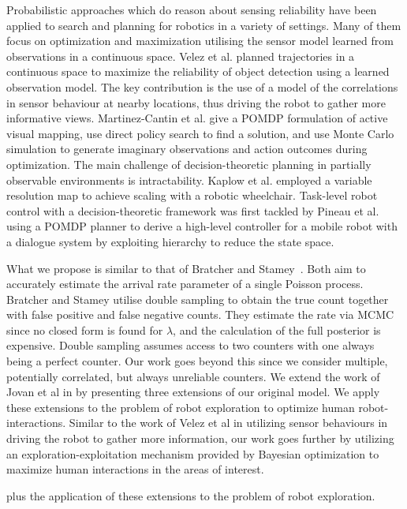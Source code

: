 Probabilistic approaches which do reason about sensing reliability have been applied to search and planning for robotics in a variety of settings. Many of them focus on optimization and maximization utilising the sensor model learned from observations in a continuous space. Velez et al. \cite{velez2012modelling} planned trajectories in a continuous space to maximize the reliability of object detection using a learned observation model. The key contribution is the use of a model of the correlations in sensor behaviour at nearby locations, thus driving the robot to gather more informative views. Martinez-Cantin et al. \cite{martinez2009bayesian} give a POMDP formulation of active visual mapping, use direct policy search to find a solution, and use Monte Carlo simulation to generate imaginary observations and action outcomes during optimization. The main challenge of decision-theoretic planning in partially observable environments is intractability. Kaplow et al. \cite{kaplow2010variable} employed a variable resolution map to achieve scaling with a robotic wheelchair. Task-level robot control with a decision-theoretic framework was first tackled by Pineau et al. \cite{pineau2003towards} using a POMDP planner to derive a high-level controller for a mobile robot with a dialogue system by exploiting hierarchy to reduce the state space.

What we propose is similar to that of Bratcher and Stamey~\cite{bratcher2002}. Both aim to accurately estimate the arrival rate parameter of a single Poisson process. Bratcher and Stamey utilise double sampling to obtain the true count together with false positive and false negative counts. They estimate the rate via MCMC since no closed form is found for $\lambda$, and the calculation of the full posterior is expensive. Double sampling assumes access to two counters with one always being a perfect counter. Our work goes beyond this since we consider multiple, potentially correlated, but always unreliable counters. We extend the work of Jovan et al in \cite{jovan18a} by presenting three extensions of our original model. We apply these extensions to the problem of robot exploration to optimize human robot-interactions. Similar to the work of Velez et al \cite{velez2012modelling} in utilizing sensor behaviours in driving the robot to gather more information, our work goes further by utilizing an exploration-exploitation mechanism provided by Bayesian optimization to maximize human interactions in the areas of interest.


plus the application of these extensions to the problem of robot exploration.

